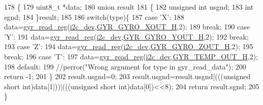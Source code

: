 \begin{DoxyCode}
178 \{
179   uint8\_t *data;
180   \textcolor{keyword}{union }result
181   \{
182     \textcolor{keywordtype}{unsigned} \textcolor{keywordtype}{int} usgnd;
183     \textcolor{keywordtype}{int} sgnd;
184   \}result;
185 
186   \textcolor{keywordflow}{switch}(type)\{
187     \textcolor{keywordflow}{case} \textcolor{charliteral}{'X'}:
188       data=\hyperlink{group__gyr_gad817a3b69d4c3026b7a9b6de32753e7b}{gyr\_read\_reg}(\hyperlink{CommunicationV0_2communication_8c_a7751bd45ac1064efb35adf1f19c25db8}{i2c\_dev},\hyperlink{communication_2imu__regs_8h_a45d3d3c92328dd02072aae7d8cf14ad0}{GYR\_GYRO\_XOUT\_H},2);
189       \textcolor{keywordflow}{break};
190     \textcolor{keywordflow}{case} \textcolor{charliteral}{'Y'}:
191       data=\hyperlink{group__gyr_gad817a3b69d4c3026b7a9b6de32753e7b}{gyr\_read\_reg}(\hyperlink{CommunicationV0_2communication_8c_a7751bd45ac1064efb35adf1f19c25db8}{i2c\_dev},\hyperlink{communication_2imu__regs_8h_a7664c10b8291231d44694e154c218fab}{GYR\_GYRO\_YOUT\_H},2);
192       \textcolor{keywordflow}{break};
193     \textcolor{keywordflow}{case} \textcolor{charliteral}{'Z'}:
194       data=\hyperlink{group__gyr_gad817a3b69d4c3026b7a9b6de32753e7b}{gyr\_read\_reg}(\hyperlink{CommunicationV0_2communication_8c_a7751bd45ac1064efb35adf1f19c25db8}{i2c\_dev},\hyperlink{communication_2imu__regs_8h_ae4d2753664f152db1bef259f99975b4c}{GYR\_GYRO\_ZOUT\_H},2);
195       \textcolor{keywordflow}{break};
196     \textcolor{keywordflow}{case} \textcolor{charliteral}{'T'}:
197       data=\hyperlink{group__gyr_gad817a3b69d4c3026b7a9b6de32753e7b}{gyr\_read\_reg}(\hyperlink{CommunicationV0_2communication_8c_a7751bd45ac1064efb35adf1f19c25db8}{i2c\_dev},\hyperlink{communication_2imu__regs_8h_a7d00eaf1ea076429433ad0c787b48200}{GYR\_TEMP\_OUT\_H},2);
198     \textcolor{keywordflow}{default}:
199       \textcolor{comment}{//perror("Wrong argument for type in gyr\_read\_data");}
200       \textcolor{keywordflow}{return} -1;
201   \}
202   result.usgnd=0;
203   result.usgnd=result.usgnd|(((\textcolor{keywordtype}{unsigned} \textcolor{keywordtype}{short} int)data[1]))|(((\textcolor{keywordtype}{unsigned} \textcolor{keywordtype}{short} \textcolor{keywordtype}{int})data[0])<<8);
204   \textcolor{keywordflow}{return} result.sgnd;
205 \}
\end{DoxyCode}

